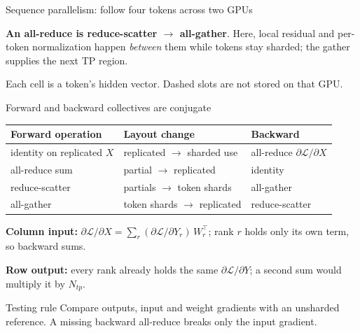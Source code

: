 \documentclass[handout]{beamer}
\begin{document}
\begin{frame}{Sequence parallelism: follow four tokens across two GPUs}
  \vspace{-2pt}
  \begin{block}{}
    \textbf{An all-reduce is reduce-scatter $\rightarrow$ all-gather}. Here, local residual and per-token normalization happen \emph{between} them while tokens stay sharded; the gather supplies the next TP region.
  \end{block}
  \scriptsize Each cell is a token’s hidden vector. Dashed slots are not stored on that GPU.
\end{frame}

\begin{frame}{Forward and backward collectives are conjugate}
  \small
  \centering
  \begin{tabular}{@{}lll@{}}
    \toprule
    Forward operation & Layout change & Backward \\
    \midrule
    identity on replicated $X$ & replicated $\to$ sharded use & all-reduce $\partial\mathcal{L}/\partial X$ \\
    all-reduce sum & partial $\to$ replicated & identity \\
    reduce-scatter & partials $\to$ token shards & all-gather \\
    all-gather & token shards $\to$ replicated & reduce-scatter \\
    \bottomrule
  \end{tabular}
  \par\vfill\vspace{4pt}\raggedright
  \textbf{Column input:} $\partial\mathcal{L}/\partial X=\sum_{r}(\partial\mathcal{L}/\partial Y_r)\,W_r^{\top}$; rank $r$ holds only its own term, so backward sums.\par\smallskip
  \textbf{Row output:} every rank already holds the same $\partial\mathcal{L}/\partial Y$; a second sum would multiply it by $N_{tp}$.
  \vfill
  \begin{alertblock}{Testing rule}
    Compare outputs, input and weight gradients with an unsharded reference. A missing backward all-reduce breaks only the input gradient.
  \end{alertblock}
\end{frame}
\end{document}
